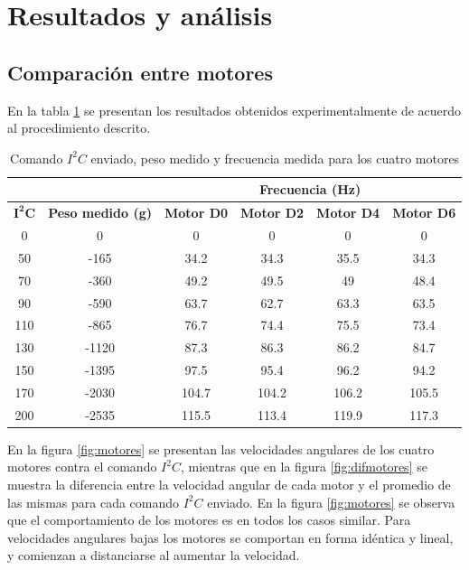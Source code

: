 \documentclass[main]{subfiles}
\begin{document}
\section{Resultados y an\'alisis}

\subsection{Comparaci\'on entre motores}
\label{sec:motores} 

En la tabla \ref{tab:motores} se presentan los resultados obtenidos experimentalmente de acuerdo al procedimiento descrito. 


\begin{table}[H]
\centering
\begin{tabular}{|c|c|c|c|c|c|} 
	\cline{3-6} \multicolumn{1}{c}{} & \multicolumn{1}{c}{} & 
	\multicolumn{4}{|c|}{\cellcolor[gray]{0.6}Frecuencia (Hz)} \\ \hline
	\cellcolor[gray]{0.8} {$\mathbf{I^2C}$} & 
	\cellcolor[gray]{0.8} \textbf{Peso medido (g)} &
	\cellcolor[gray]{0.8} \textbf{Motor D0} &
	\cellcolor[gray]{0.8} \textbf{Motor D2} &
	\cellcolor[gray]{0.8} \textbf{Motor D4} &
	\cellcolor[gray]{0.8} \textbf{Motor D6}   \\ \hline \hline
	  0 &      0 &    0 &    0 &    0 &    0 \\ \hline
	 50 &-165 & 34.2 & 34.3 & 35.5 & 34.3 \\ \hline
	 70 &-360 & 49.2 & 49.5 &   49 & 48.4 \\ \hline
	 90 & -590 & 63.7 & 62.7 & 63.3 & 63.5 \\ \hline
	110 & -865 & 76.7 & 74.4 & 75.5 & 73.4 \\ \hline
	130 &  -1120 & 87.3 & 86.3 & 86.2 & 84.7 \\ \hline
	150 & -1395 & 97.5 & 95.4 & 96.2 & 94.2 \\ \hline
	170 & -2030 &104.7 &104.2 &106.2 &105.5 \\ \hline
	200 & -2535 &115.5 &113.4 &119.9 &117.3 \\ \hline
\end{tabular}
\caption{Comando $I^2C$ enviado, peso medido y frecuencia medida para los cuatro motores}
\label{tab:motores}
\end{table}

En la figura \ref{fig:motores} se presentan las velocidades angulares de los cuatro motores contra el comando $I^2C$, mientras que en la figura \ref{fig:difmotores} se muestra la diferencia entre la velocidad angular de cada motor y el promedio de las mismas para cada comando $I^2C$ enviado. En la figura \ref{fig:motores} se observa que el comportamiento de los motores es en todos los casos similar. Para velocidades angulares bajas los motores se comportan en forma id\'entica y lineal, y comienzan a distanciarse al aumentar la velocidad.\\
 
\end{document}

